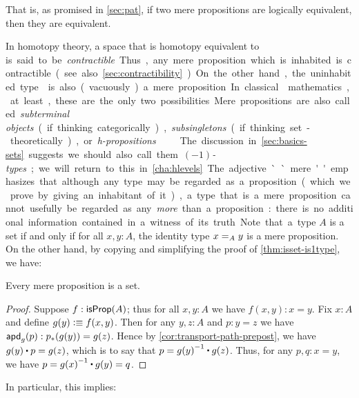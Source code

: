 That is, as promised in \autoref{sec:pat}, if two mere propositions are logically equivalent, then they are equivalent.

In homotopy theory, a space that is homotopy equivalent to \unit is said to be \emph{contractible}.
Thus, any mere proposition which is inhabited is contractible (see also \autoref{sec:contractibility}).
On the other hand, the uninhabited type \emptyt is also (vacuously) a mere proposition.
In classical mathematics, at least, these are the only two possibilities.

Mere propositions are also called \emph{subterminal objects} (if thinking categorically), \emph{subsingletons} (if thinking set-theoretically), or \emph{h-propositions}.
%
%
%
The discussion in \autoref{sec:basics-sets} suggests we should also call them \emph{$(-1)$-types}; we will return to this in \autoref{cha:hlevels}.
The adjective ``mere'' emphasizes that although any type may be regarded as a proposition (which we prove by giving an inhabitant of it), a type that is a mere proposition cannot usefully be regarded as any \emph{more} than a proposition: there is no additional information contained in a witness of its truth.

Note that a type $A$ is a set if and only if for all $x,y:A$, the identity type $\id[A]xy$ is a mere proposition.
On the other hand, by copying and simplifying the proof of \autoref{thm:isset-is1type}, we have:

\begin{lem}\label{thm:prop-set}
  Every mere proposition is a set.
\end{lem}
\begin{proof}
  Suppose $f:\isprop(A)$; thus for all $x,y:A$ we have $f(x,y):x=y$.  Fix $x:A$
  and define $g(y)\defeq f(x,y)$.   Then for any $y,z:A$ and $p:y=z$ we have $\apd
  g p : \trans{p}{g(y)}={g(z)}$.  Hence by \autoref{cor:transport-path-prepost}, we have
  $g(y)\ct p = g(z)$, which is to say that $p=\opp{g(y)}\ct g(z)$.  Thus, for
  any $p,q:x=y$, we have $p = \opp{g(x)}\ct g(y) = q$.
\end{proof}

In particular, this implies:

